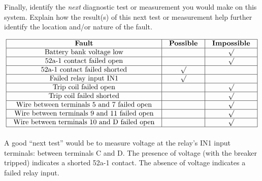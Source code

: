 Finally, identify the {\it next} diagnostic test or measurement you would make on this system.  Explain how the result(s) of this next test or measurement help further identify the location and/or nature of the fault.







 







$$\vbox{\offinterlineskip
\halign{\strut
\vrule \quad\hfil # \ \hfil & 
\vrule \quad\hfil # \ \hfil & 
\vrule \quad\hfil # \ \hfil \vrule \cr
\noalign{\hrule}
%
{\bf Fault} & {\bf Possible} & {\bf Impossible} \cr
%
\noalign{\hrule}
%
Battery bank voltage low &  & $\surd$ \cr
%
\noalign{\hrule}
%
52a-1 contact failed open &  & $\surd$ \cr
%
\noalign{\hrule}
%
52a-1 contact failed shorted & $\surd$ & \cr
%
\noalign{\hrule}
%
Failed relay input IN1 & $\surd$ &  \cr
%
\noalign{\hrule}
%
Trip coil failed open &  & $\surd$ \cr
%
\noalign{\hrule}
%
Trip coil failed shorted &  & $\surd$ \cr
%
\noalign{\hrule}
%
Wire between terminals 5 and 7 failed open &  & $\surd$ \cr
%
\noalign{\hrule}
%
Wire between terminals 9 and 11 failed open &  & $\surd$ \cr
%
\noalign{\hrule}
%
Wire between terminals 10 and D failed open &  & $\surd$ \cr
%
\noalign{\hrule}
} %
}$$ %

A good ``next test'' would be to measure voltage at the relay's IN1 input terminals: between terminals C and D.  The presence of voltage (with the breaker tripped) indicates a shorted 52a-1 contact.  The absence of voltage indicates a failed relay input.




